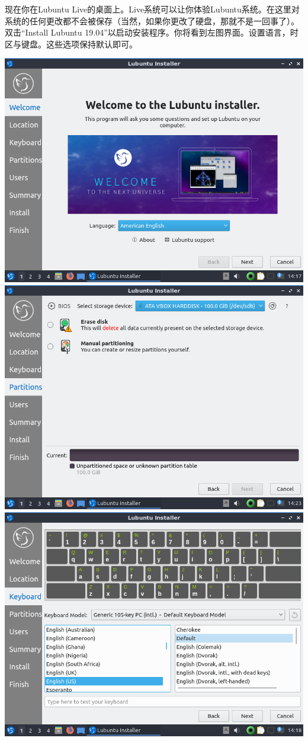 现在你在Lubuntu Live的桌面上。Live系统可以让你体验Lubuntu系统。在这里对系统的任何更改都不会被保存（当然，如果你更改了硬盘，那就不是一回事了）。双击“Install Lubuntu 19.04”以启动安装程序。你将看到左图界面。设置语言，时区与键盘。这些选项保持默认即可。
\begin{center}
	\includegraphics[scale=0.4]{pic/lubinst3}	\includegraphics[scale=0.4]{pic/lubinst7}\\
	\includegraphics[scale=0.4]{pic/lubinst5}
\end{center} \par
